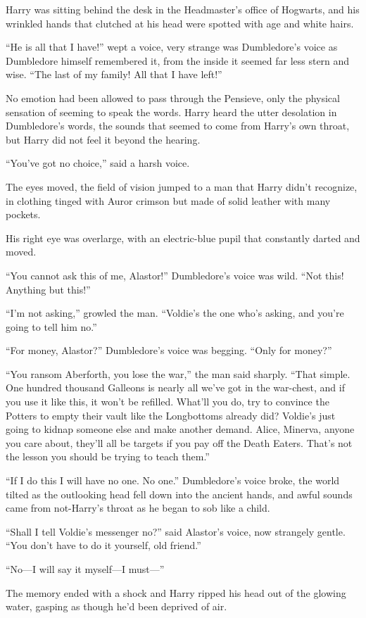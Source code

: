 \begin{em}
Harry was sitting behind the desk in the Headmaster's office of Hogwarts, 
and his wrinkled hands that clutched at his head were spotted with age and 
white hairs.

``He is all that I have!'' wept a voice, very strange was Dumbledore's 
voice as Dumbledore himself remembered it, from the inside it seemed far less 
stern and wise. ``The last of my family! All that I have left!''

No emotion had been allowed to pass through the Pensieve, only the 
physical sensation of seeming to speak the words. Harry heard the utter 
desolation in Dumbledore's words, the sounds that seemed to come from Harry's 
own throat, but Harry did not feel it beyond the hearing.

``You've got no choice,'' said a harsh voice.

The eyes moved, the field of vision jumped to a man that Harry didn't 
recognize, in clothing tinged with Auror crimson but made of solid leather with 
many pockets.

His right eye was overlarge, with an electric-blue pupil that constantly 
darted and moved.

``You cannot ask this of me, Alastor!'' Dumbledore's voice was wild. ``Not 
this! Anything but this!''

``I'm not asking,'' growled the man. ``Voldie's the one who's asking, and 
you're going to tell him no.''

``For money, Alastor?'' Dumbledore's voice was begging. ``Only for money?''

``You ransom Aberforth, you lose the war,'' the man said sharply. ``That 
simple. One hundred thousand Galleons is nearly all we've got in the war-chest, 
and if you use it like this, it won't be refilled. What'll you do, try to 
convince the Potters to empty their vault like the Longbottoms already did? 
Voldie's just going to kidnap someone else and make another demand. Alice, 
Minerva, anyone you care about, they'll all be targets if you pay off the Death 
Eaters. That's not the lesson you should be trying to teach them.''

``If I do this I will have no one. No one.'' Dumbledore's voice broke, the 
world tilted as the outlooking head fell down into the ancient hands, and awful 
sounds came from not-Harry's throat as he began to sob like a child.

``Shall I tell Voldie's messenger no?'' said Alastor's voice, now strangely 
gentle. ``You don't have to do it yourself, old friend.''

``No---I will say it myself---I must---''
\end{em}
\sbreak
The memory ended with a shock and Harry ripped his head out of the glowing 
water, gasping as though he'd been deprived of air.

